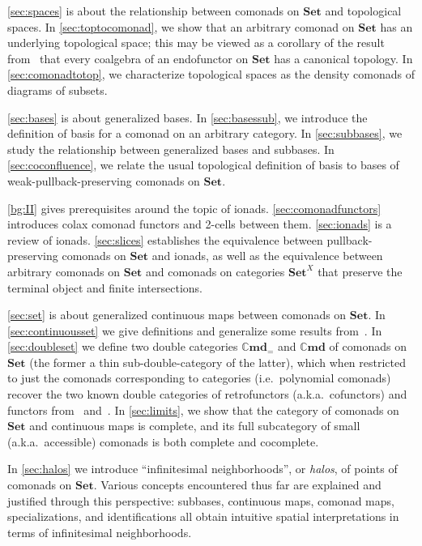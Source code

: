 \documentclass[11pt, oneside, article]{memoir}
\theoremstyle{plain}
\theoremstyle{definition}
\theoremstyle{remark}
\newcommand{\namedcat}[1]{\mathbf{#1}}
\newcommand{\Set}{\namedcat{Set}}
\newcommand{\Cmd}{\mathbb{C}\namedcat{md}}
\newcommand{\CmdSet}{\Cmd}
\newcommand{\CmdId}{\Cmd_=}
\newcommand{\CmdIdSet}{\CmdId}
\begin{document}
\cref{sec:spaces} is about the relationship between comonads on $\Set$
and topological spaces. In \cref{sec:toptocomonad}, we show that an
arbitrary comonad on $\Set$ has an underlying topological space; this
may be viewed as a corollary of the result
from~\cite{gumm-schroder:bounded} that every coalgebra of an
endofunctor on $\Set$ has a canonical topology. In
\cref{sec:comonadtotop}, we characterize topological spaces as the
density comonads of diagrams of subsets.

\cref{sec:bases} is about generalized bases. In \cref{sec:basessub},
we introduce the definition of basis for a comonad on an arbitrary
category. In \cref{sec:subbases}, we study the relationship between
generalized bases and subbases. In \cref{sec:coconfluence}, we relate
the usual topological definition of basis to bases of
weak-pullback-preserving comonads on $\Set$.

\cref{bg:II} gives prerequisites around the topic of
ionads. \cref{sec:comonadfunctors} introduces colax comonad functors and
2-cells between them. \cref{sec:ionads} is a review of
ionads. \cref{sec:slices} establishes the equivalence between
pullback-preserving comonads on $\Set$ and ionads, as well as the
equivalence between arbitrary comonads on $\Set$ and comonads on
categories $\Set^X$ that preserve the terminal object and finite
intersections.

\cref{sec:set} is about generalized continuous maps between comonads
on $\Set$. In \cref{sec:continuousset} we give definitions and
generalize some results from~\cite{garner:ionads}. In
\cref{sec:doubleset} we define two double categories $\CmdIdSet$ and
$\CmdSet$ of comonads on $\Set$ (the former a thin sub-double-category
of the latter), which when restricted to just the comonads
corresponding to categories (i.e.\ polynomial comonads) recover the
two known double categories of retrofunctors (a.k.a.\ cofunctors) and
functors from~\cite{clarke} and~\cite{clarke-dimeglio}. In
\cref{sec:limits}, we show that the category of comonads on $\Set$ and
continuous maps is complete, and its full subcategory of small
(a.k.a.\ accessible) comonads is both complete and cocomplete.

In \cref{sec:halos} we introduce ``infinitesimal neighborhoods'', or
\emph{halos}, of points of comonads on $\Set$.  Various concepts
encountered thus far are explained and justified through this
perspective: subbases, continuous maps, comonad maps, specializations,
and identifications all obtain intuitive spatial interpretations in
terms of infinitesimal neighborhoods.
\end{document}
